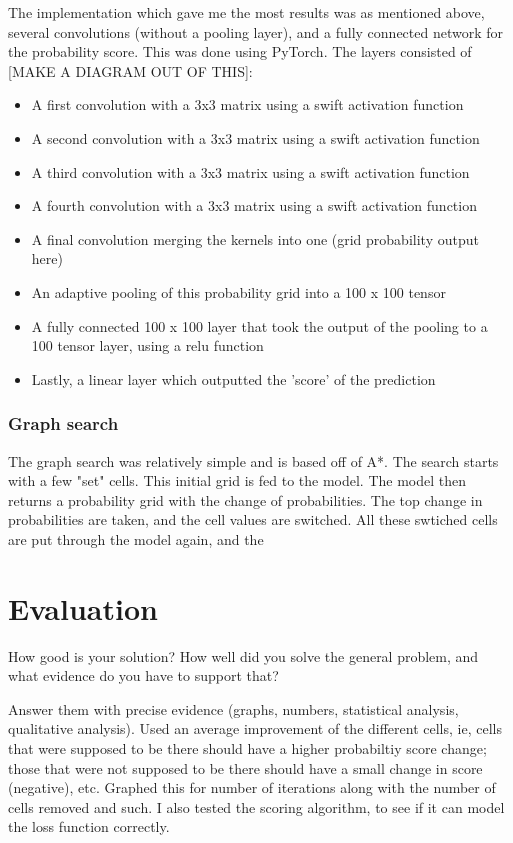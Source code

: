 \documentclass{l4proj}
\begin{document}
The implementation which gave me the most results was as mentioned above, several convolutions (without a pooling layer), and a fully connected network for the probability score. This was done using PyTorch. The layers consisted of [MAKE A DIAGRAM OUT OF THIS]:
\begin{itemize}
  \item A first convolution with a 3x3 matrix using a swift activation function
  \item A second convolution with a 3x3 matrix using a swift activation function
  \item A third convolution with a 3x3 matrix using a swift activation function
  \item A fourth convolution with a 3x3 matrix using a swift activation function
  \item A final convolution merging the kernels into one (grid probability output here)
  \item An adaptive pooling of this probability grid into a 100 x 100 tensor 
  \item A fully connected 100 x 100 layer that took the output of the pooling to a 100 tensor layer, using a relu function
  \item Lastly, a linear layer which outputted the 'score' of the prediction
\end{itemize}


\subsection{Graph search}

The graph search was relatively simple and is based off of A*. The search starts with a few "set" cells. This initial grid is fed to the model. The model then returns a probability grid with the change of probabilities. The top change in probabilities are taken, and the cell values are switched. All these swtiched cells are put through the model again, and the 



\chapter{Evaluation} 
How good is your solution? How well did you solve the general problem, and what evidence do you have to support that?

        Answer them with precise evidence (graphs, numbers, statistical
        analysis, qualitative analysis).
        Used an average improvement of the different cells, ie, cells that were supposed to be there should have a higher probabiltiy score change; those that were not supposed to be there should have a small change in score (negative), etc. Graphed this for number of iterations along with the number of cells removed and such.
        I also tested the scoring algorithm, to see if it can model the loss function correctly.
\end{document}
